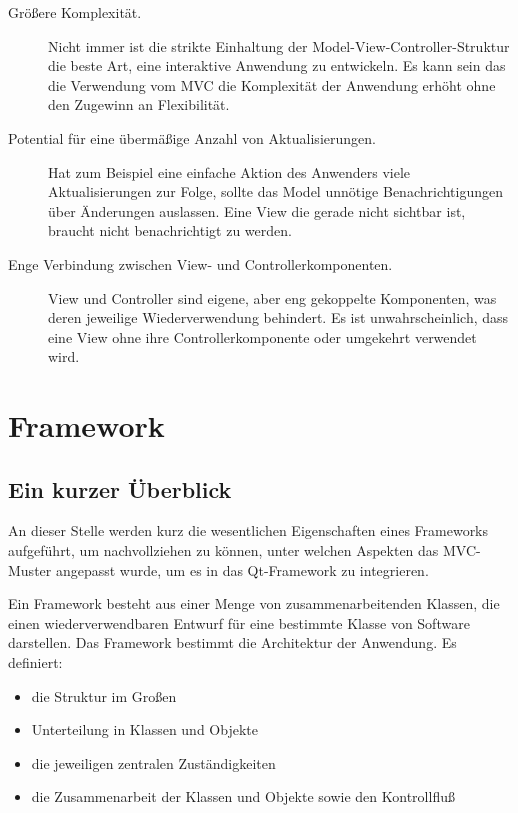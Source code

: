 \documentclass[11pt,a4paper,titlepage]{scrreprt}
\begin{document}
\begin{description}
\item[Größere Komplexität.]
Nicht immer ist die strikte Einhaltung der Model-View-Controller-Struktur die beste Art, eine
interaktive Anwendung zu entwickeln. Es kann sein das die Verwendung vom MVC die Komplexität
der Anwendung erhöht ohne den Zugewinn an Flexibilität.


\item[Potential für eine übermäßige Anzahl von Aktualisierungen.] Hat zum Beispiel eine
einfache Aktion des Anwenders viele Aktualisierungen zur Folge, sollte das Model unnötige
Benachrichtigungen über Änderungen auslassen. Eine View die gerade nicht sichtbar ist, braucht
nicht benachrichtigt zu werden.

\item[Enge Verbindung zwischen View- und Controllerkomponenten.] View und Controller sind
eigene, aber eng gekoppelte Komponenten, was deren jeweilige Wiederverwendung behindert.
Es ist unwahrscheinlich, dass eine View ohne ihre Controllerkomponente oder umgekehrt
verwendet wird.
\end{description}

\chapter{Framework}
\section{Ein kurzer Überblick}
An dieser Stelle werden kurz die wesentlichen Eigenschaften eines Frameworks aufgeführt,
um nachvollziehen zu können, unter welchen Aspekten das MVC-Muster angepasst wurde, um es
in das Qt-Framework zu integrieren.{\medskip}

Ein Framework besteht aus einer Menge von zusammenarbeitenden Klassen, die einen
wiederverwendbaren Entwurf für eine bestimmte Klasse von Software darstellen. Das
Framework bestimmt die Architektur der Anwendung. Es definiert:

\begin{itemize}
\item die Struktur im Großen
\item Unterteilung in Klassen und Objekte
\item die jeweiligen zentralen Zuständigkeiten
\item die Zusammenarbeit der Klassen und Objekte sowie den Kontrollfluß
\end{itemize}
\end{document}
